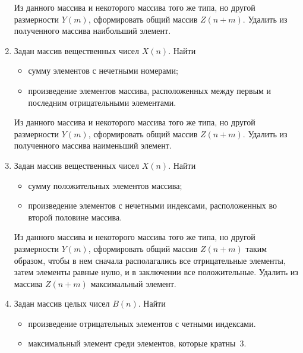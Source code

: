 \begin{enumerate}
Из данного массива и некоторого массива того же типа, но другой размерности $Y(m)$,
сформировать общий массив $Z(n+m)$. Удалить из полученного массива наибольший
элемент.
\item Задан массив вещественных чисел $X(n)$. Найти
\begin{itemize}
\item сумму элементов с нечетными номерами;
\item произведение элементов массива, расположенных между первым и последним отрицательными элементами.
\end{itemize}
Из данного массива и некоторого массива того же типа, но другой размерности $Y(m)$,
сформировать общий массив $Z(n+m)$. Удалить из полученного массива наименьший
элемент.
\item Задан массив вещественных чисел $X(n)$. Найти
\begin{itemize}
\item сумму положительных элементов массива;
\item произведение элементов с нечетными индексами, расположенных во второй половине массива. 
\end{itemize}
Из данного массива и некоторого массива того же типа, но другой размерности $Y(m)$,
сформировать общий массив $Z(n+m)$ таким образом, чтобы в нем сначала располагались
все отрицательные элементы, затем элементы равные нулю, и в заключении все положительные. Удалить из массива
$Z(n+m)$ максимальный элемент.
\item Задан массив целых чисел $B(n)$. Найти
\begin{itemize}
\item произведение отрицательных элементов с четными индексами.
\item максимальный элемент среди элементов, которые кратны~3.
\end{itemize}


\end{enumerate}
